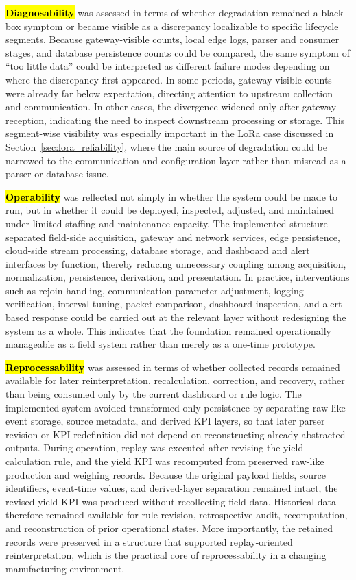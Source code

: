 \documentclass[systems,article,accept,pdftex,moreauthors]{Definitions/mdpi}
\begin{document}
\textbf{\hl{Diagnosability}} was assessed in terms of whether degradation remained a black-box symptom or became visible as a discrepancy localizable to specific lifecycle segments. Because gateway-visible counts, local edge logs, parser and consumer stages, and database persistence counts could be compared, the same symptom of ``too little data'' could be interpreted as different failure modes depending on where the discrepancy first appeared. In some periods, gateway-visible counts were already far below expectation, directing attention to upstream collection and communication. In other cases, the divergence widened only after gateway reception, indicating the need to inspect downstream processing or storage. This segment-wise visibility was especially important in the LoRa case discussed in Section~\ref{sec:lora_reliability}, where the main source of degradation could be narrowed to the communication and configuration layer rather than misread as a parser or database issue.

\textbf{\hl{Operability}} was reflected not simply in whether the system could be made to run, but in whether it could be deployed, inspected, adjusted, and maintained under limited staffing and maintenance capacity. The implemented structure separated field-side acquisition, gateway and network services, edge persistence, cloud-side stream processing, database storage, and dashboard and alert interfaces by function, thereby reducing unnecessary coupling among acquisition, normalization, persistence, derivation, and presentation. In practice, interventions such as rejoin handling, communication-parameter adjustment, logging verification, interval tuning, packet comparison, dashboard inspection, and alert-based response could be carried out at the relevant layer without redesigning the system as a whole. This indicates that the foundation remained operationally manageable as a field system rather than merely as a one-time prototype.

\textbf{\hl{Reprocessability}} was assessed in terms of whether collected records remained available for later reinterpretation, recalculation, correction, and recovery, rather than being consumed only by the current dashboard or rule logic. The implemented system avoided transformed-only persistence by separating raw-like event storage, source metadata, and derived KPI layers, so that later parser revision or KPI redefinition did not depend on reconstructing already abstracted outputs. During operation, replay was executed after revising the yield calculation rule, and the yield KPI was recomputed from preserved raw-like production and weighing records. Because the original payload fields, source identifiers, event-time values, and derived-layer separation remained intact, the revised yield KPI was produced without recollecting field data. Historical data therefore remained available for rule revision, retrospective audit, recomputation, and reconstruction of prior operational states. More importantly, the retained records were preserved in a structure that supported replay-oriented reinterpretation, which is the practical core of reprocessability in a changing manufacturing environment.
\end{document}
